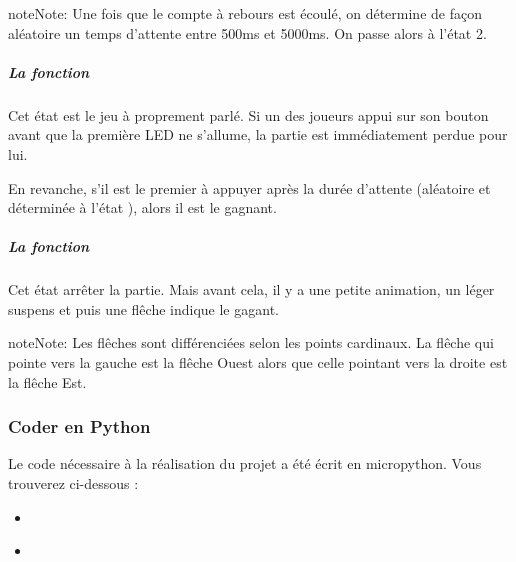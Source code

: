 \documentclass[letterpaper,10pt,french]{sphinxmanual}
\begin{document}
\noindent{}

\begin{sphinxadmonition}{note}{Note:}
Une fois que le compte à rebours est écoulé, on détermine
de façon aléatoire un temps d’attente entre 500ms et 5000ms.
On passe alors à l’état 2.
\end{sphinxadmonition}


\subparagraph{La fonction }
\label{\detokenize{projets/goFast-bloc-coder:la-fonction-etat-2}}
Cet état est le jeu à proprement parlé. Si un des joueurs appui
sur son bouton avant que la première LED ne s’allume, la partie est
immédiatement perdue pour lui.

En revanche, s’il est le premier à appuyer après la durée d’attente
(aléatoire et déterminée à l’état ), alors il est le gagnant.

\noindent{}


\subparagraph{La fonction }
\label{\detokenize{projets/goFast-bloc-coder:la-fonction-etat-3}}
Cet état arrêter la partie. Mais avant cela, il y a une petite
animation, un léger suspens et puis une flêche indique le gagant.

\noindent{}

\begin{sphinxadmonition}{note}{Note:}
Les flêches sont différenciées selon les points cardinaux. La flêche
qui pointe vers la gauche est la flêche Ouest alors que celle pointant
vers la droite est la flêche Est.
\end{sphinxadmonition}
\label{\detokenize{projets/goFast-python-coder:gofast-bloc-coder}}
\ignorespaces 

\subsubsection{Coder en Python}
\label{\detokenize{projets/goFast-python-coder:index-0}}\label{\detokenize{projets/goFast-python-coder:coder-en-python}}\label{\detokenize{projets/goFast-python-coder::doc}}
Le code nécessaire à la réalisation du projet {\hyperref[\detokenize{projets/goFast:projetgofast}]{}} a été
écrit en micropython. Vous trouverez ci-dessous :
\begin{itemize}
\item {} 
{\hyperref[\detokenize{projets/goFast-python-coder:le-code-etape-par-etape}]{}}

\item {} 
{\hyperref[\detokenize{projets/goFast-python-coder:le-code-final}]{}}

\end{itemize}
\end{document}
